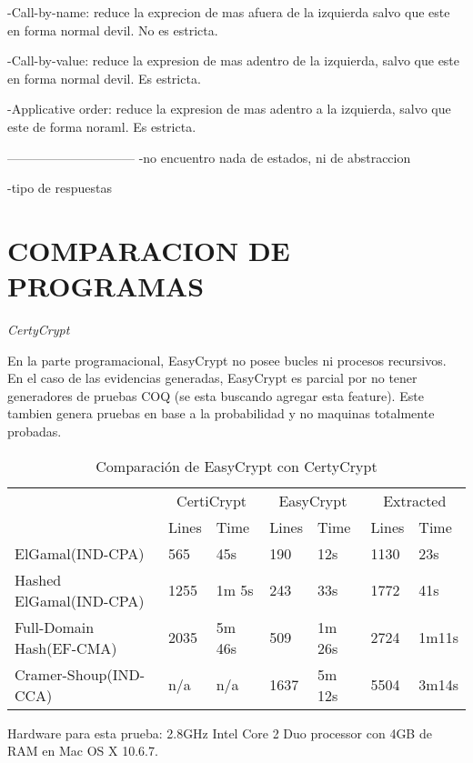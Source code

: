 \documentclass[runningheads,a4paper]{llncs}
\begin{document}
	-Call-by-name: reduce la exprecion de mas afuera de la izquierda salvo que este en forma normal devil. No es estricta.

	-Call-by-value: reduce la expresion de mas adentro de la izquierda, salvo que este en forma normal devil. Es estricta.

	-Applicative order: reduce la expresion de mas adentro a la izquierda, salvo que este de forma noraml. Es estricta.\cite{article6}


------------------------------
-no encuentro nada de estados, ni de abstraccion

-tipo de respuestas


\section{COMPARACION DE PROGRAMAS}
\centerline{\emph{CertyCrypt}}

En la parte programacional, EasyCrypt no posee bucles ni procesos recursivos. En el caso de las evidencias generadas, EasyCrypt es parcial por no tener generadores de pruebas COQ (se esta buscando agregar esta feature). Este tambien genera pruebas en base a la probabilidad y no maquinas totalmente probadas.

\begin{table}
  \caption{Comparación de EasyCrypt con CertyCrypt}
  \label{tab:simple1}
  \centering
  \begin{tabular}{ |p{3.5cm}|p{1.5cm}|p{1.5cm}|p{1.5cm}|p{1.5cm}|p{1.5cm}|p{1.5cm}|  }
 \hline
 & \multicolumn{2}{|c|}{CertiCrypt} & \multicolumn{2}{|c|}{EasyCrypt} & \multicolumn{2}{|c|}{Extracted} \\\cline{2-7}

 &Lines&Time&Lines&Time&Lines&Time\\\cline{2-7}
 \hline
 ElGamal(IND-CPA) & 565 & 45s & 190 & 12s & 1130 & 23s\\
 Hashed ElGamal(IND-CPA) & 1255  & 1m 5s & 243  & 33s & 1772 & 41s\\
 Full-Domain Hash(EF-CMA) & 2035 & 5m 46s&  509 & 1m 26s & 2724 & 1m11s\\
 Cramer-Shoup(IND-CCA) & n/a & n/a & 1637 & 5m 12s & 5504 & 3m14s\\
 \hline
\end{tabular}
\end{table}

Hardware para esta prueba: 2.8GHz Intel Core 2 Duo processor con 4GB de RAM en Mac OS X 10.6.7.\cite{article5}
\end{document}
